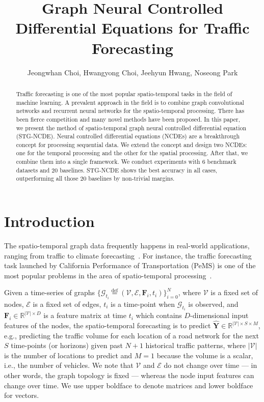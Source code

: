 \documentclass[letterpaper]{article} \usepackage{aaai22}  \usepackage{times}  \usepackage{helvet}  \usepackage{courier}  \usepackage[hyphens]{url}  \usepackage{graphicx} \urlstyle{rm} \def\UrlFont{\rm}  \usepackage{natbib}  \usepackage{caption} \DeclareCaptionStyle{ruled}{labelfont=normalfont,labelsep=colon,strut=off} \frenchspacing  \setlength{\pdfpagewidth}{8.5in}  \setlength{\pdfpageheight}{11in}  \usepackage{stfloats}
\title{Graph Neural Controlled Differential Equations for Traffic Forecasting}
\author {
    Jeongwhan Choi, Hwangyong Choi, Jeehyun Hwang, Noseong Park
}
\begin{document}
\maketitle

\begin{abstract}
Traffic forecasting is one of the most popular spatio-temporal tasks in the field of machine learning. A prevalent approach in the field is to combine graph convolutional networks and recurrent neural networks for the spatio-temporal processing. There has been fierce competition and many novel methods have been proposed. In this paper, we present the method of spatio-temporal graph neural controlled differential equation (STG-NCDE). Neural controlled differential equations (NCDEs) are a breakthrough concept for processing sequential data. We extend the concept and design two NCDEs: one for the temporal processing and the other for the spatial processing. After that, we combine them into a single framework. We conduct experiments with 6 benchmark datasets and 20 baselines. STG-NCDE shows the best accuracy in all cases, outperforming all those 20 baselines by non-trivial margins.
\end{abstract}


\section{Introduction}
The spatio-temporal graph data frequently happens in real-world applications, ranging from traffic to climate forecasting~\cite{zaytar2016sequence, shi2015convolutional,shi2017deep, liu2016application, racah2016extremeweather, kurth2018exascale, cheng2018ensemble, cheng2018neural, hossain2015forecasting, ren2021deep, tekin2021spatio,li2018dcrnn_traffic,bing2018stgcn,wu2019graphwavenet,guo2019astgcn,bai2019STG2Seq,song2020stsgcn,huang2020lsgcn,NEURIPS2020_ce1aad92,li2021stfgnn,chen2021ZGCNET,fang2021STODE}. For instance, the traffic forecasting task launched by California Performance of Transportation (PeMS) is one of the most popular problems in the area of spatio-temporal processing~\cite{chen2001freeway,bing2018stgcn,guo2019astgcn}.

Given a time-series of graphs $\{\mathcal{G}_{t_i} \stackrel{\text{def}}{=} (\mathcal{V},\mathcal{E},\bm{F}_{i}, t_i)\}_{i=0}^{N}$, where $\mathcal{V}$ is a fixed set of nodes, $\mathcal{E}$ is a fixed set of edges, $t_i$ is a time-point when $\mathcal{G}_{t_i}$ is observed, and $\bm{F}_{i} \in \mathbb{R}^{|\mathcal{V}| \times D}$ is a feature matrix at time $t_i$ which contains $D$-dimensional input features of the nodes, the spatio-temporal forecasting is to predict $\hat{\bm{Y}} \in \mathbb{R}^{|\mathcal{V}| \times S  \times M}$, e.g., predicting the traffic volume for each location of a road network for the next $S$ time-points (or horizons) given past $N+1$ historical traffic patterns, where $|\mathcal{V}|$ is the number of locations to predict and $M=1$ because the volume is a scalar, i.e., the number of vehicles. We note that $\mathcal{V}$ and $\mathcal{E}$ do not change over time --- in other words, the graph topology is fixed --- whereas the node input features can change over time. We use upper boldface to denote matrices and lower boldface for vectors.
\end{document}

